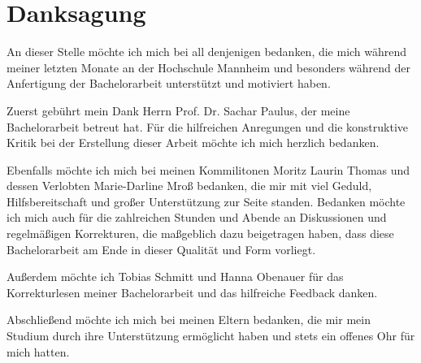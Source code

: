 \chapter*{Danksagung}
An dieser Stelle möchte ich mich bei all denjenigen bedanken, die mich während meiner letzten Monate an der Hochschule Mannheim und besonders während der Anfertigung der Bachelorarbeit unterstützt und motiviert haben.

Zuerst gebührt mein Dank Herrn Prof. Dr. Sachar Paulus, der meine Bachelorarbeit betreut hat. Für die hilfreichen Anregungen und die konstruktive Kritik bei der Erstellung dieser Arbeit möchte ich mich herzlich bedanken.

Ebenfalls möchte ich mich bei meinen Kommilitonen Moritz Laurin Thomas und dessen Verlobten Marie-Darline Mroß bedanken, die mir mit viel Geduld, Hilfsbereitschaft und großer Unterstützung zur Seite standen. Bedanken möchte ich mich auch für die zahlreichen Stunden und Abende an Diskussionen und regelmäßigen Korrekturen, die maßgeblich dazu beigetragen haben, dass diese Bachelorarbeit am Ende in dieser Qualität und Form vorliegt.

Außerdem möchte ich Tobias Schmitt und Hanna Obenauer für das Korrekturlesen meiner Bachelorarbeit und das hilfreiche Feedback danken.

Abschließend möchte ich mich bei meinen Eltern bedanken, die mir mein Studium durch ihre Unterstützung ermöglicht haben und stets ein offenes Ohr für mich hatten.